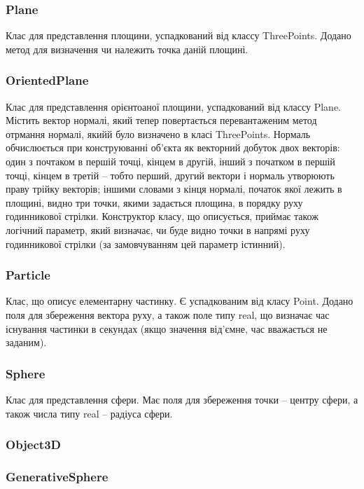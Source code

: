 \documentclass[a4paper,12pt]{article}
\begin{document}
\subsubsection{Plane}
Клас для представлення площини, успадкований від классу ThreePoints. Додано метод для визначення чи належить точка даній площині.

\subsubsection{OrientedPlane}
Клас для представлення орієнтоаної площини, успадкований від классу Plane. Містить вектор нормалі, який тепер повертається перевантаженим метод отрмання нормалі, якийй було визначено в класі ThreePoints. Нормаль обчислюється при конструюванні об’єкта як векторний добуток двох векторів: один з почтаком в першій точці, кінцем в другій, інший з початком в першій точці, кінцем в третій  -- тобто перший, другий вектори і нормаль утворюють праву трійку векторів; іншими словами з кінця нормалі, початок якої лежить в площині, видно три точки, якими задається площина, в порядку руху годинникової стрілки. Конструктор класу, що описується, приймає також логічний параметр, який визначає, чи буде видно точки в напрямі руху годинникової стрілки (за замовчуванням цей параметр істинний).

\subsubsection{Particle}
Клас, що описує елементарну частинку. Є успадкованим від класу Point. Додано поля для збереження вектора руху, а також поле типу real, що визначає час існування частинки в секундах (якщо значення від’ємне, час вважається не заданим).

\subsubsection{Sphere}
Клас для представлення сфери. Має поля для збереження точки -- центру сфери, а також числа типу real -- радіуса сфери.

\subsubsection{Object3D}

\subsubsection{GenerativeSphere}
\end{document}
